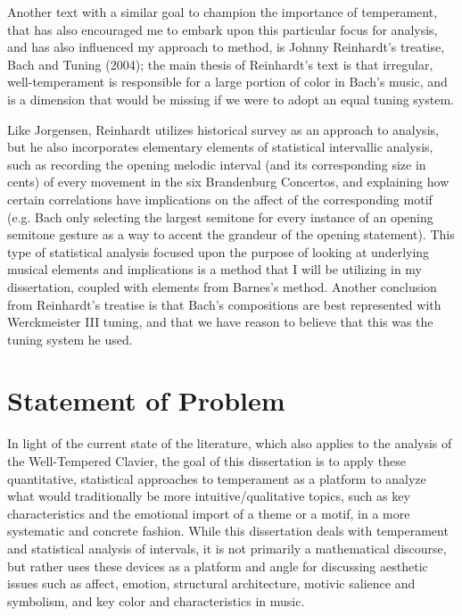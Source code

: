 Another text with a similar goal to champion the importance of
temperament, that has also encouraged me to embark upon this particular
focus for analysis, and has also influenced my approach to method, is
Johnny Reinhardt's treatise, Bach and Tuning (2004); the main thesis of
Reinhardt's text is that irregular, well-temperament is responsible for
a large portion of color in Bach's music, and is a dimension that would
be missing if we were to adopt an equal tuning system.

Like Jorgensen, Reinhardt utilizes historical survey as an approach to
analysis, but he also incorporates elementary elements of statistical
intervallic analysis, such as recording the opening melodic interval
(and its corresponding size in cents) of every movement in the six
Brandenburg Concertos, and explaining how certain correlations have
implications on the affect of the corresponding motif (e.g. Bach only
selecting the largest semitone for every instance of an opening semitone
gesture as a way to accent the grandeur of the opening statement). This
type of statistical analysis focused upon the purpose of looking at
underlying musical elements and implications is a method that I will be
utilizing in my dissertation, coupled with elements from Barnes's
method. Another conclusion from Reinhardt's treatise is that Bach's
compositions are best represented with Werckmeister III tuning, and that
we have reason to believe that this was the tuning system he used.

    \section{Statement of Problem}\label{statement-of-problem}

In light of the current state of the literature, which also applies to
the analysis of the Well-Tempered Clavier, the goal of this dissertation
is to apply these quantitative, statistical approaches to temperament as
a platform to analyze what would traditionally be more
intuitive/qualitative topics, such as key characteristics and the
emotional import of a theme or a motif, in a more systematic and
concrete fashion. While this dissertation deals with temperament and
statistical analysis of intervals, it is not primarily a mathematical
discourse, but rather uses these devices as a platform and angle for
discussing aesthetic issues such as affect, emotion, structural
architecture, motivic salience and symbolism, and key color and
characteristics in music.

